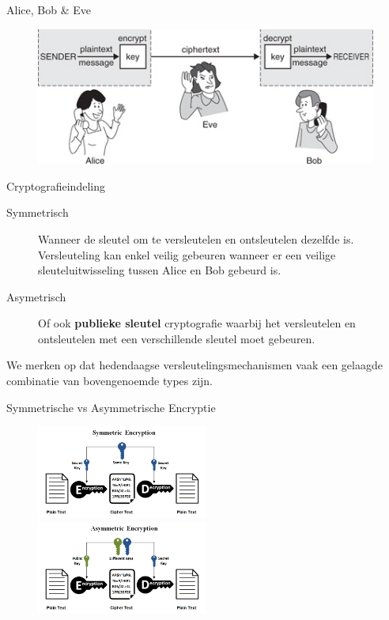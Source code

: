 \documentclass{beamer}
\begin{document}
\begin{frame}{Alice, Bob \& Eve}
	\begin{figure}
		\includegraphics[width=\textwidth]{img/adameve.jpg}
	\end{figure}
\end{frame}

\begin{frame}{Cryptografieindeling}
	\begin{description}
		\item[Symmetrisch] Wanneer de sleutel om te versleutelen en ontsleutelen dezelfde is. Versleuteling kan enkel veilig gebeuren wanneer er een veilige sleuteluitwisseling tussen Alice en Bob gebeurd is.
	\item[Asymetrisch] Of ook \textbf{publieke sleutel} cryptografie waarbij het versleutelen en ontsleutelen met een verschillende sleutel moet
	gebeuren.
\end{description}
We merken op dat hedendaagse versleutelingsmechanismen vaak een gelaagde combinatie van bovengenoemde types zijn.
\end{frame}

\begin{frame}{Symmetrische vs Asymmetrische Encryptie}
\begin{figure}
	\includegraphics[width=0.50\textwidth]{img/Symmetric-Encryption.png}
	\quad
	\includegraphics[width=0.50\textwidth]{img/Asymmetric-Encryption.png}
\end{figure}
\end{frame}
\end{document}
